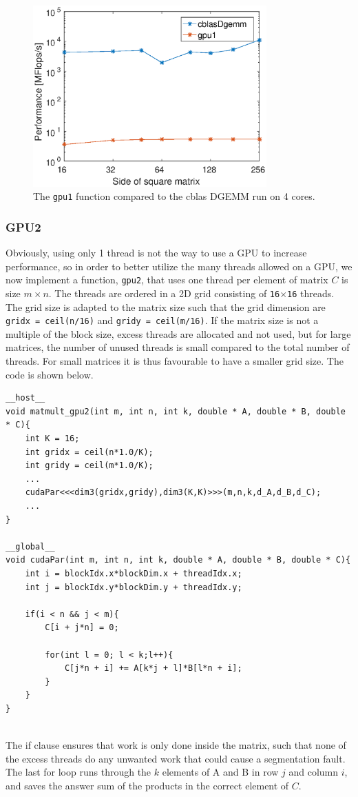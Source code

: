 \begin{figure}
\centering
\includegraphics[width = 0.8\textwidth]{fig/gpu1.eps}
\caption{The \texttt{gpu1} function compared to the cblas DGEMM run on 4 cores.}
\label{fig:gpu1_DGEMM}
\end{figure}

\subsubsection{GPU2}
Obviously, using only 1 thread is not the way to use a GPU to increase performance, so in order to better utilize the many threads allowed on a GPU, we now implement a function, \texttt{gpu2}, that uses one thread per element of matrix $C$ is size $m\times n$. The threads are ordered in a 2D grid consisting of \texttt{16$\times$16} threads. The grid size is adapted to the matrix size such that the grid dimension are \texttt{gridx = ceil(n/16)} and \texttt{gridy = ceil(m/16)}. If the matrix size is not a multiple of the block size, excess threads are allocated and not used, but for large matrices, the number of unused threads is small compared to the total number of threads. For small matrices it is thus favourable to have a smaller grid size. The code is shown below.
\begin{lstlisting}[caption = Code sample of the naive implementation with one thread per element in $C$.]
__host__
void matmult_gpu2(int m, int n, int k, double * A, double * B, double * C){	
	int K = 16;
	int gridx = ceil(n*1.0/K);
	int gridy = ceil(m*1.0/K);
	...
	cudaPar<<<dim3(gridx,gridy),dim3(K,K)>>>(m,n,k,d_A,d_B,d_C);
	...
}

__global__
void cudaPar(int m, int n, int k, double * A, double * B, double * C){
	int i = blockIdx.x*blockDim.x + threadIdx.x;
	int j = blockIdx.y*blockDim.y + threadIdx.y;

	if(i < n && j < m){
		C[i + j*n] = 0;

		for(int l = 0; l < k;l++){
			C[j*n + i] += A[k*j + l]*B[l*n + i];
		}
	}
}
	
\end{lstlisting}
The if clause ensures that work is only done inside the matrix, such that none of the excess threads do any unwanted work that could cause a segmentation fault. The last for loop runs through the $k$ elements of A and B in row $j$ and column $i$, and saves the answer sum of the products in the correct element of $C$.

